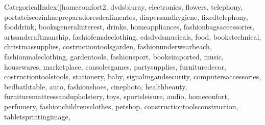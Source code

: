 \documentclass[letterpaper,10pt,english]{jupyterBook}
\begin{document}
\begin{sphinxVerbatim}[commandchars=\\\{\}]
CategoricalIndex([\PYGZsq{}home\PYGZus{}comfort\PYGZus{}2\PYGZsq{}, \PYGZsq{}dvds\PYGZus{}blu\PYGZus{}ray\PYGZsq{}, \PYGZsq{}electronics\PYGZsq{}, \PYGZsq{}flowers\PYGZsq{},
                  \PYGZsq{}telephony\PYGZsq{}, \PYGZsq{}portateis\PYGZus{}cozinha\PYGZus{}e\PYGZus{}preparadores\PYGZus{}de\PYGZus{}alimentos\PYGZsq{},
                  \PYGZsq{}diapers\PYGZus{}and\PYGZus{}hygiene\PYGZsq{}, \PYGZsq{}fixed\PYGZus{}telephony\PYGZsq{}, \PYGZsq{}food\PYGZus{}drink\PYGZsq{},
                  \PYGZsq{}books\PYGZus{}general\PYGZus{}interest\PYGZsq{}, \PYGZsq{}drinks\PYGZsq{}, \PYGZsq{}home\PYGZus{}appliances\PYGZsq{},
                  \PYGZsq{}fashion\PYGZus{}bags\PYGZus{}accessories\PYGZsq{}, \PYGZsq{}arts\PYGZus{}and\PYGZus{}craftmanship\PYGZsq{},
                  \PYGZsq{}fashio\PYGZus{}female\PYGZus{}clothing\PYGZsq{}, \PYGZsq{}cds\PYGZus{}dvds\PYGZus{}musicals\PYGZsq{}, \PYGZsq{}food\PYGZsq{},
                  \PYGZsq{}books\PYGZus{}technical\PYGZsq{}, \PYGZsq{}christmas\PYGZus{}supplies\PYGZsq{},
                  \PYGZsq{}costruction\PYGZus{}tools\PYGZus{}garden\PYGZsq{}, \PYGZsq{}fashion\PYGZus{}underwear\PYGZus{}beach\PYGZsq{},
                  \PYGZsq{}fashion\PYGZus{}male\PYGZus{}clothing\PYGZsq{}, \PYGZsq{}garden\PYGZus{}tools\PYGZsq{}, \PYGZsq{}fashion\PYGZus{}sport\PYGZsq{},
                  \PYGZsq{}books\PYGZus{}imported\PYGZsq{}, \PYGZsq{}music\PYGZsq{}, \PYGZsq{}housewares\PYGZsq{}, \PYGZsq{}market\PYGZus{}place\PYGZsq{},
                  \PYGZsq{}consoles\PYGZus{}games\PYGZsq{}, \PYGZsq{}party\PYGZus{}supplies\PYGZsq{}, \PYGZsq{}furniture\PYGZus{}decor\PYGZsq{},
                  \PYGZsq{}costruction\PYGZus{}tools\PYGZus{}tools\PYGZsq{}, \PYGZsq{}stationery\PYGZsq{}, \PYGZsq{}baby\PYGZsq{},
                  \PYGZsq{}signaling\PYGZus{}and\PYGZus{}security\PYGZsq{}, \PYGZsq{}computers\PYGZus{}accessories\PYGZsq{},
                  \PYGZsq{}bed\PYGZus{}bath\PYGZus{}table\PYGZsq{}, \PYGZsq{}auto\PYGZsq{}, \PYGZsq{}fashion\PYGZus{}shoes\PYGZsq{}, \PYGZsq{}cine\PYGZus{}photo\PYGZsq{},
                  \PYGZsq{}health\PYGZus{}beauty\PYGZsq{}, \PYGZsq{}furniture\PYGZus{}mattress\PYGZus{}and\PYGZus{}upholstery\PYGZsq{}, \PYGZsq{}toys\PYGZsq{},
                  \PYGZsq{}sports\PYGZus{}leisure\PYGZsq{}, \PYGZsq{}audio\PYGZsq{}, \PYGZsq{}home\PYGZus{}confort\PYGZsq{}, \PYGZsq{}perfumery\PYGZsq{},
                  \PYGZsq{}fashion\PYGZus{}childrens\PYGZus{}clothes\PYGZsq{}, \PYGZsq{}pet\PYGZus{}shop\PYGZsq{},
                  \PYGZsq{}construction\PYGZus{}tools\PYGZus{}construction\PYGZsq{}, \PYGZsq{}tablets\PYGZus{}printing\PYGZus{}image\PYGZsq{},

\end{sphinxVerbatim}
\end{document}
